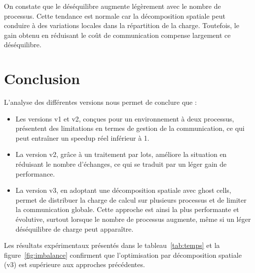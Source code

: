 \documentclass[a4paper,13pt]{book}
\begin{document}
\noindent
On constate que le déséquilibre augmente légèrement avec le nombre de processus. Cette tendance est normale car la décomposition spatiale peut conduire à des variations locales dans la répartition de la charge. Toutefois, le gain obtenu en réduisant le coût de communication compense largement ce déséquilibre.

\section{Conclusion}

L'analyse des différentes versions nous permet de conclure que :

\begin{itemize}
  \item Les versions v1 et v2, conçues pour un environnement à deux processus, présentent des limitations en termes de gestion de la communication, ce qui peut entraîner un speedup réel inférieur à 1.
  \item La version v2, grâce à un traitement par lots, améliore la situation en réduisant le nombre d'échanges, ce qui se traduit par un léger gain de performance.
  \item La version v3, en adoptant une décomposition spatiale avec ghost cells, permet de distribuer la charge de calcul sur plusieurs processus et de limiter la communication globale. Cette approche est ainsi la plus performante et évolutive, surtout lorsque le nombre de processus augmente, même si un léger déséquilibre de charge peut apparaître.
\end{itemize}

Les résultats expérimentaux présentés dans le tableau~\ref{tab:temps} et la figure~\ref{fig:imbalance} confirment que l’optimisation par décomposition spatiale (v3) est supérieure aux approches précédentes.
\end{document}

